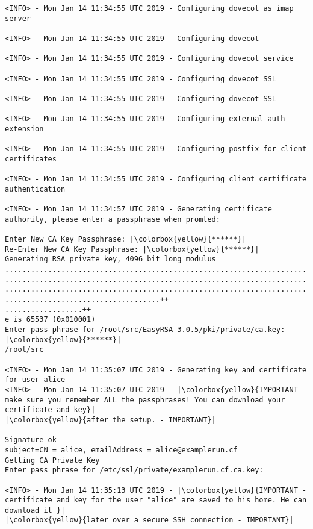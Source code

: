  \begin{lstlisting}[escapeinside=||]    
<INFO> - Mon Jan 14 11:34:55 UTC 2019 - Configuring dovecot as imap server

<INFO> - Mon Jan 14 11:34:55 UTC 2019 - Configuring dovecot

<INFO> - Mon Jan 14 11:34:55 UTC 2019 - Configuring dovecot service

<INFO> - Mon Jan 14 11:34:55 UTC 2019 - Configuring dovecot SSL

<INFO> - Mon Jan 14 11:34:55 UTC 2019 - Configuring dovecot SSL

<INFO> - Mon Jan 14 11:34:55 UTC 2019 - Configuring external auth extension

<INFO> - Mon Jan 14 11:34:55 UTC 2019 - Configuring postfix for client certificates

<INFO> - Mon Jan 14 11:34:55 UTC 2019 - Configuring client certificate authentication

<INFO> - Mon Jan 14 11:34:57 UTC 2019 - Generating certificate authority, please enter a passphrase when promted:

Enter New CA Key Passphrase: |\colorbox{yellow}{******}|
Re-Enter New CA Key Passphrase: |\colorbox{yellow}{******}|
Generating RSA private key, 4096 bit long modulus
........................................................................
........................................................................
........................................................................
....................................++                                                                               
..................++
e is 65537 (0x010001)
Enter pass phrase for /root/src/EasyRSA-3.0.5/pki/private/ca.key: |\colorbox{yellow}{******}|
/root/src

<INFO> - Mon Jan 14 11:35:07 UTC 2019 - Generating key and certificate for user alice
<INFO> - Mon Jan 14 11:35:07 UTC 2019 - |\colorbox{yellow}{IMPORTANT - make sure you remember ALL the passphrases! You can download your certificate and key}| 
|\colorbox{yellow}{after the setup. - IMPORTANT}|

Signature ok
subject=CN = alice, emailAddress = alice@examplerun.cf
Getting CA Private Key
Enter pass phrase for /etc/ssl/private/examplerun.cf.ca.key:

<INFO> - Mon Jan 14 11:35:13 UTC 2019 - |\colorbox{yellow}{IMPORTANT - certificate and key for the user "alice" are saved to his home. He can download it }|
|\colorbox{yellow}{later over a secure SSH connection - IMPORTANT}|


\end{lstlisting}
